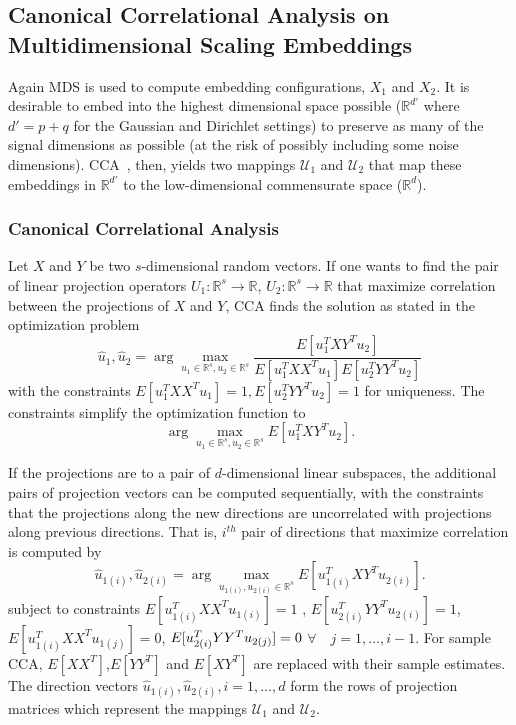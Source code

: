 \documentclass[11pt]{article} %
\begin{document}
\subsection{Canonical Correlational  Analysis on Multidimensional Scaling Embeddings} 

Again MDS is used  to compute embedding configurations, $ X_1$ and $X_2$. It is desirable to  embed into the highest dimensional space  possible ($\mathbb{R}^{d'}$ where $d'=p+q$ for the Gaussian and Dirichlet settings)  to  preserve as many of the signal dimensions as possible (at the risk of possibly including  some noise dimensions). CCA~\cite{Hardoon2004}, then,  yields two mappings $\mathcal{U}_1$ and $\mathcal{U}_2$ that map these embeddings in $\mathbb{R}^{d'}$ to  the low-dimensional commensurate space ($\mathbb{R}^d$). 

\subsubsection*{Canonical Correlational Analysis}

 Let $X$ and $Y$ be two $s$-dimensional random vectors. If  one wants to find  the pair of linear projection operators $U_1:\mathbb{R}^s \rightarrow  \mathbb{R}$, $U_2 :\mathbb{R}^s \rightarrow  \mathbb{R}$ that maximize correlation between the projections of   $X$ and $Y$, CCA finds the solution as stated in the  optimization problem
$$
{\hat{u}_1 ,\hat{u}_2}=\arg\max_{u_1\in\mathbb{R}^s,u_2\in\mathbb{R}^s} {\frac{E[u_1^{T}XY^Tu_2]}{{E[u_1^{T}XX^T u_1]}{E[u_2^{T}YY^T u_2]}}}$$
with the constraints $E[{u_1^{T}XX^T u_1}]=1 , E[{u_2^{T}YY^T u_2}]=1$ for uniqueness. The constraints simplify the optimization function to $$
\arg\max_{u_1\in \mathbb{R}^s,u_2\in \mathbb{R}^s} {E[u_1^{T}XY^Tu_2]}.$$

If the projections are to a pair of $d$-dimensional linear subspaces, the additional pairs of projection vectors can be computed sequentially, with the constraints that the projections along the new directions are uncorrelated with  projections along previous directions. That is, $i^{th}$ pair of directions  that maximize correlation is computed by 
$$
{\hat{u}_{1(i)},\hat{u}_{2(i)}}=\arg\max_{u_{1(i)},u_{2(i)}\in\mathbb{R}^s} {E[u_{1(i)}^{T}XY^Tu_{2(i)}]}.$$ subject to constraints $E[{u_{1(i)}^{T}XX^T u_{1(i)}}]=1$ , $E[{u_{2(i)}^{T}YY^T u_{2(i)}}]=1$, $E[{u_{1(i)}^{T}XX^T u_{1(j)}}]=0$,  
   $ E[{u_{2(i)}^{T}YY^T u_{2(j)}}]=\nolinebreak0$ $\forall \quad  j=1,\ldots,i-1$. For sample CCA, $E[XX^T]$,$E[YY^T]$ and $E[XY^T]$ are replaced with their sample estimates. The direction vectors ${\hat{u}_{1(i)},\hat{u}_{2(i)}}, i=1,\ldots,d $ form the rows of projection matrices which represent the mappings $\mathcal{U}_1$ and $\mathcal{U}_2$. 
\end{document}
